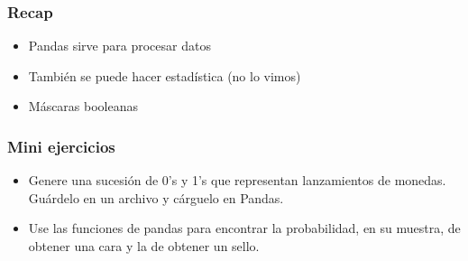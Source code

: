 \documentclass[14pt,aspectratio=169,xcolor=dvipsnames]{beamer}
\begin{document}
\begin{frame}\frametitle{Recap}
    \begin{itemize}
        \item Pandas sirve para procesar datos
        \item También se puede hacer estadística (no lo vimos)
        \item Máscaras booleanas
    \end{itemize}

    \pause
    \vspace{1cm}
\end{frame}
\begin{frame}
    \maketitle
\end{frame}
\begin{frame}\frametitle{Mini ejercicios}
    \begin{itemize}
        \item Genere una sucesión de 0's y 1's que representan lanzamientos de monedas. Guárdelo en un archivo  y cárguelo en Pandas.
        \item Use las funciones de pandas para encontrar la probabilidad, en su muestra, de obtener una cara y la de obtener un sello.
    \end{itemize}
\end{frame}
\end{document}
